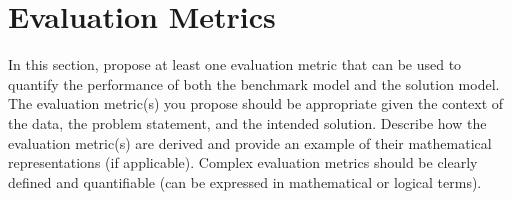 \section{Evaluation Metrics} \label{Metric}

In this section, propose at least one evaluation metric that can be used to quantify the performance of both the benchmark model and the solution model. The evaluation metric(s) you propose should be appropriate given the context of the data, the problem statement, and the intended solution. Describe how the evaluation metric(s) are derived and provide an example of their mathematical representations (if applicable). Complex evaluation metrics should be clearly defined and quantifiable (can be expressed in mathematical or logical terms).


